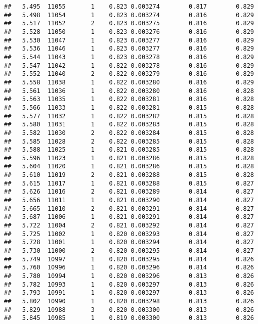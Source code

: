 \documentclass[
]{book}
\begin{document}
\begin{verbatim}
##   5.495  11055       1    0.823 0.003274        0.817        0.829
##   5.498  11054       1    0.823 0.003274        0.816        0.829
##   5.517  11052       2    0.823 0.003275        0.816        0.829
##   5.528  11050       1    0.823 0.003276        0.816        0.829
##   5.530  11047       1    0.823 0.003277        0.816        0.829
##   5.536  11046       1    0.823 0.003277        0.816        0.829
##   5.544  11043       1    0.823 0.003278        0.816        0.829
##   5.547  11042       1    0.822 0.003278        0.816        0.829
##   5.552  11040       2    0.822 0.003279        0.816        0.829
##   5.558  11038       1    0.822 0.003280        0.816        0.829
##   5.561  11036       1    0.822 0.003280        0.816        0.828
##   5.563  11035       1    0.822 0.003281        0.816        0.828
##   5.566  11033       1    0.822 0.003281        0.815        0.828
##   5.577  11032       1    0.822 0.003282        0.815        0.828
##   5.580  11031       1    0.822 0.003283        0.815        0.828
##   5.582  11030       2    0.822 0.003284        0.815        0.828
##   5.585  11028       2    0.822 0.003285        0.815        0.828
##   5.588  11025       1    0.821 0.003285        0.815        0.828
##   5.596  11023       1    0.821 0.003286        0.815        0.828
##   5.604  11020       1    0.821 0.003286        0.815        0.828
##   5.610  11019       2    0.821 0.003288        0.815        0.828
##   5.615  11017       1    0.821 0.003288        0.815        0.827
##   5.626  11016       2    0.821 0.003289        0.814        0.827
##   5.656  11011       1    0.821 0.003290        0.814        0.827
##   5.665  11010       2    0.821 0.003291        0.814        0.827
##   5.687  11006       1    0.821 0.003291        0.814        0.827
##   5.722  11004       2    0.821 0.003292        0.814        0.827
##   5.725  11002       1    0.820 0.003293        0.814        0.827
##   5.728  11001       1    0.820 0.003294        0.814        0.827
##   5.730  11000       2    0.820 0.003295        0.814        0.827
##   5.749  10997       1    0.820 0.003295        0.814        0.826
##   5.760  10996       1    0.820 0.003296        0.814        0.826
##   5.780  10994       1    0.820 0.003296        0.813        0.826
##   5.782  10993       1    0.820 0.003297        0.813        0.826
##   5.793  10991       1    0.820 0.003297        0.813        0.826
##   5.802  10990       1    0.820 0.003298        0.813        0.826
##   5.829  10988       3    0.820 0.003300        0.813        0.826
##   5.845  10985       1    0.819 0.003300        0.813        0.826

\end{verbatim}
\end{document}
